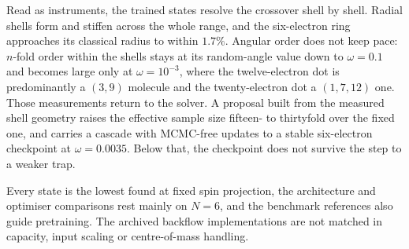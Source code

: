 Read as instruments, the trained states resolve the crossover shell by shell. Radial shells
form and stiffen across the whole range, and the six-electron ring approaches its classical
radius to within $1.7\%$. Angular order does not keep pace: $n$-fold order within the shells
stays at its random-angle value down to $\omega=0.1$ and becomes large only at
$\omega=10^{-3}$, where the twelve-electron dot is predominantly a $(3,9)$ molecule and the
twenty-electron dot a $(1,7,12)$ one. Those measurements return to the solver. A proposal
built from the measured shell geometry raises the effective sample size fifteen- to
thirtyfold over the fixed one, and carries a cascade with MCMC-free updates to a stable
six-electron checkpoint at $\omega=0.0035$. Below that, the checkpoint does not survive the
step to a weaker trap.

Every state is the lowest found at fixed spin projection, the architecture and optimiser
comparisons rest mainly on $N{=}6$, and the benchmark references also guide pretraining. The
archived backflow implementations are not matched in capacity, input scaling or
centre-of-mass handling.
\clearpage
